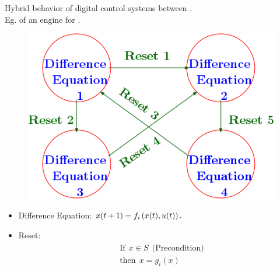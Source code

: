 \begin{frame}{Hybrid behavior of digital control systems}
 between .\\
Eg.   of an engine for .
\begin{figure}
\center
\includegraphics[scale=0.4]{fig/hybrid-model.png}
\end{figure}
\begin{itemize}
\item Difference Equation: $x(t+1)=f_i\left(x(t),u(t)\right).$
\item Reset: \vspace{-1.5em}
\begin{align}
\begin{split}
& \text{If}~~x\in S~~\text{(Precondition)}\\
& \text{then}~~x = g_i(x)
\end{split}
\end{align}
\end{itemize}
\end{frame}

